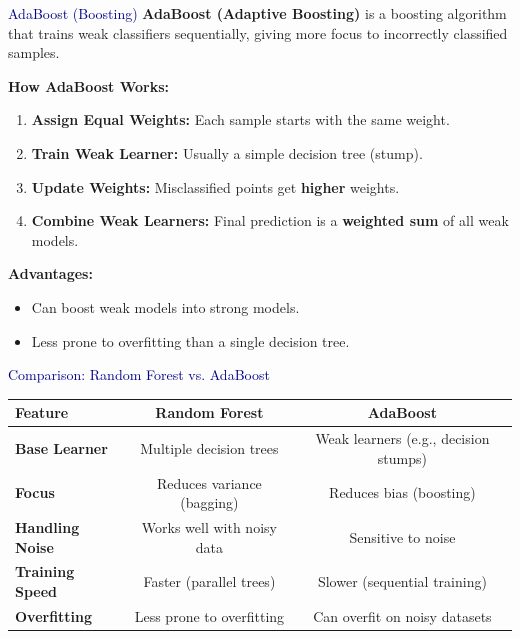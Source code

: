 \begin{frame}{\textcolor{darkblue}{AdaBoost (Boosting)}}
    \textbf{AdaBoost (Adaptive Boosting)} is a boosting algorithm that trains weak classifiers sequentially, giving more focus to incorrectly classified samples.

    \vspace{0.3cm}
    \textbf{How AdaBoost Works:}
    \begin{enumerate}
        \item \textbf{Assign Equal Weights:} Each sample starts with the same weight.
        \item \textbf{Train Weak Learner:} Usually a simple decision tree (stump).
        \item \textbf{Update Weights:} Misclassified points get \textbf{higher} weights.
        \item \textbf{Combine Weak Learners:} Final prediction is a \textbf{weighted sum} of all weak models.
    \end{enumerate}

    \vspace{0.3cm}
    \textbf{Advantages:}
    \begin{itemize}
        \item Can boost weak models into strong models.
        \item Less prone to overfitting than a single decision tree.
    \end{itemize}
\end{frame}

\begin{frame}{\textcolor{darkblue}{Comparison: Random Forest vs. AdaBoost}}
    \begin{tabular}{|l|c|c|}
        \hline
        \textbf{Feature} & \textbf{Random Forest} & \textbf{AdaBoost} \\
        \hline
        \textbf{Base Learner} & Multiple decision trees & Weak learners (e.g., decision stumps) \\
        \hline
        \textbf{Focus} & Reduces variance (bagging) & Reduces bias (boosting) \\
        \hline
        \textbf{Handling Noise} & Works well with noisy data & Sensitive to noise \\
        \hline
        \textbf{Training Speed} & Faster (parallel trees) & Slower (sequential training) \\
        \hline
        \textbf{Overfitting} & Less prone to overfitting & Can overfit on noisy datasets \\
        \hline
    \end{tabular}
\end{frame}

